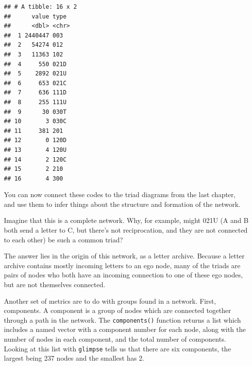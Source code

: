 \documentclass[
]{book}
\newenvironment{Shaded}{\begin{snugshade}}{\end{snugshade}}
\newcommand{\FunctionTok}[1]{\textcolor[rgb]{0.00,0.00,0.00}{#1}}
\newcommand{\NormalTok}[1]{#1}
\newcommand{\OtherTok}[1]{\textcolor[rgb]{0.56,0.35,0.01}{#1}}
\newcommand{\SpecialCharTok}[1]{\textcolor[rgb]{0.00,0.00,0.00}{#1}}
\newcommand{\StringTok}[1]{\textcolor[rgb]{0.31,0.60,0.02}{#1}}
\begin{document}
\begin{Shaded}
\end{Shaded}

\begin{verbatim}
## # A tibble: 16 x 2
##      value type 
##      <dbl> <chr>
##  1 2440447 003  
##  2   54274 012  
##  3   11363 102  
##  4     550 021D 
##  5    2892 021U 
##  6     653 021C 
##  7     636 111D 
##  8     255 111U 
##  9      30 030T 
## 10       3 030C 
## 11     381 201  
## 12       0 120D 
## 13       4 120U 
## 14       2 120C 
## 15       2 210  
## 16       4 300
\end{verbatim}

You can now connect these codes to the triad diagrams from the last chapter, and use them to infer things about the structure and formation of the network.

Imagine that this is a complete network. Why, for example, might 021U (A and B both send a letter to C, but there's not reciprocation, and they are not connected to each other) be such a common triad?

The answer lies in the origin of this network, as a letter archive. Because a letter archive contains mostly incoming letters to an ego node, many of the triads are pairs of nodes who both have an incoming connection to one of these ego nodes, but are not themselves connected.

Another set of metrics are to do with groups found in a network. First, components. A component is a group of nodes which are connected together through a path in the network. The \texttt{components()} function returns a list which includes a named vector with a component number for each node, along with the number of nodes in each component, and the total number of components. Looking at this list with \texttt{glimpse} tells us that there are six components, the largest being 237 nodes and the smallest has 2.
\end{document}
